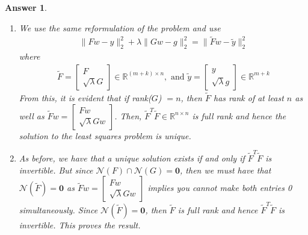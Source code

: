 \documentclass[12pt]{article}
\theoremstyle{colon}
\newtheorem*{answer}{Answer}
\begin{document}
\begin{answer}
  \

  \begin{enumerate}[label=\alph*)]
    \item We use the same reformulation of the problem and use
      \begin{gather*}
        \lVert F w - y \rVert_2^2 + \lambda \lVert G w - g \rVert_2^2 = \lVert \tilde{F} w - \tilde{y} \rVert_2^2
      \end{gather*}
      where
      \begin{gather*}
        \tilde{F} = \begin{bmatrix} F \\ \sqrt{\lambda} G \end{bmatrix} \in \mathbb{R}^{(m+k) \times n}, \text{ and } \tilde{y} = \begin{bmatrix} y \\ \sqrt{\lambda} g \end{bmatrix} \in \mathbb{R}^{m+k}
      \end{gather*}
      From this, it is evident that if rank($G$) $= n$, then $\tilde{F}$ has rank of at least $n$ as well as $\tilde{F} w = \begin{bmatrix} F w \\ \sqrt{\lambda} G w \end{bmatrix}$. Then, $\tilde{F}^T \tilde{F} \in \mathbb{R}^{n \times n}$ is full rank and hence the solution to the least squares problem is unique.

    \item As before, we have that a unique solution exists if and only if $\tilde{F}^T \tilde{F}$ is invertible. But since $\mathcal{N}(F) \cap \mathcal{N}(G) = \bm{0}$, then we must have that $\mathcal{N}(\tilde{F}) = \bm{0}$ as $\tilde{F} w = \begin{bmatrix} F w \\ \sqrt{\lambda} G w \end{bmatrix}$ implies you cannot make both entries 0 simultaneously. Since $\mathcal{N}(\tilde{F}) = \bm{0}$, then $\tilde{F}$ is full rank and hence $\tilde{F}^T \tilde{F}$ is invertible. This proves the result.
  \end{enumerate}
\end{answer}
\end{document}
